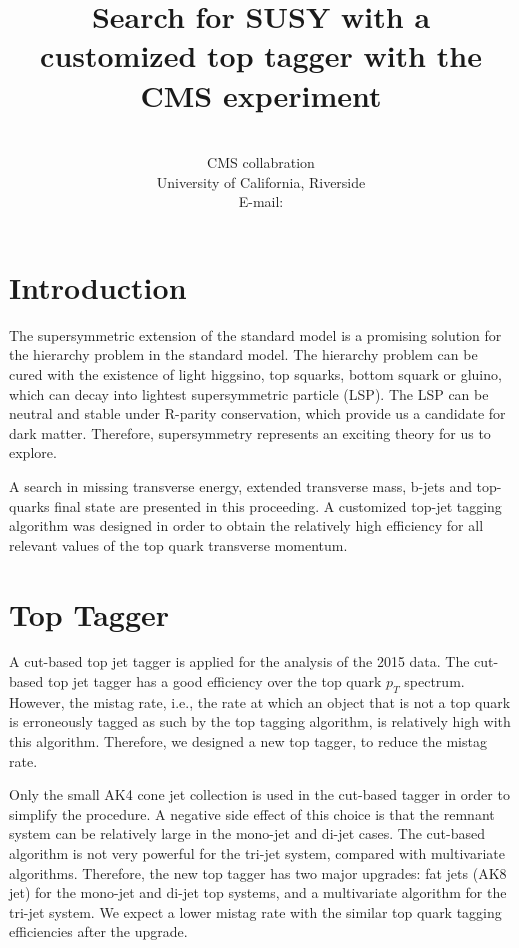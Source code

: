 \documentclass{PoS}
\title{Search for SUSY with a customized top tagger with the CMS experiment}
\author
{
  \speaker{Hua Wei}\\
  CMS collabration\\
  University of California, Riverside\\
  E-mail: \email{hua.wei@cern.ch}
}
\begin{document}
\section{Introduction}

The supersymmetric extension of the standard model is a promising solution for the hierarchy problem in the standard model. The hierarchy problem can be cured with the existence of light higgsino, top squarks, bottom squark or gluino, which can decay into lightest supersymmetric particle (LSP). The LSP can be neutral and stable under R-parity conservation, which provide us a candidate for dark matter. Therefore, supersymmetry represents an exciting theory for us to explore.

A search in missing transverse energy, extended transverse mass, b-jets and top-quarks final state are presented in this proceeding. A customized top-jet tagging algorithm was designed in order to obtain the relatively high efficiency for all relevant values of the top quark transverse momentum.

\section{Top Tagger}

A cut-based top jet tagger is applied for the analysis of the 2015 data\cite{PhysRevD.96.012004}. The cut-based top jet tagger has a good efficiency over the top quark $p_{T}$ spectrum. However, the mistag rate, i.e., the rate at which an object that is not a top quark is erroneously tagged as such by the top tagging algorithm, is relatively high with this algorithm. Therefore, we designed a new top tagger, to reduce the mistag rate.

Only the small AK4 cone jet collection is used in the cut-based tagger in order to simplify the procedure. A negative side effect of this choice is that the remnant system can be relatively large in the mono-jet and di-jet cases. The cut-based algorithm is not very powerful for the tri-jet system, compared with multivariate algorithms. Therefore, the new top tagger has two major upgrades: fat jets (AK8 jet) for the mono-jet and di-jet top systems, and a multivariate algorithm for the tri-jet system. We expect a lower mistag rate with the similar top quark tagging efficiencies after the upgrade.
\end{document}
